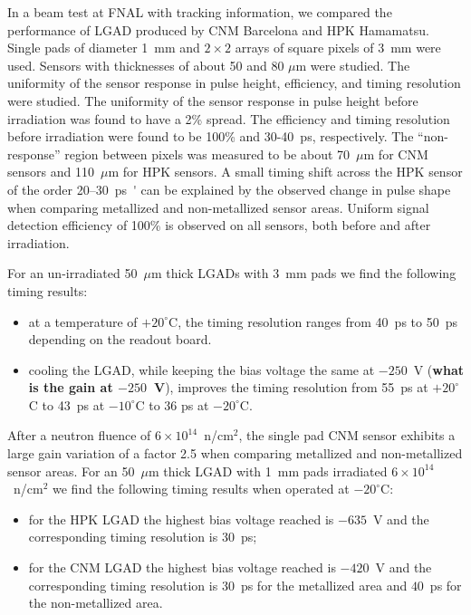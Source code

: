 \documentclass[preprint,1p]{elsarticle}
\begin{document}
In a beam test at FNAL with tracking information, we compared the performance of
LGAD produced by CNM Barcelona and HPK Hamamatsu. Single pads of diameter 1~mm
and $2\times 2$ arrays of square pixels of 3~mm were used. Sensors with
thicknesses of about 50 and 80 $\mu$m were studied. The uniformity of the
sensor response in pulse height, efficiency, and timing resolution
were studied. The uniformity of the
sensor response in pulse height before irradiation was found to have a
2\% spread. The efficiency and timing  resolution before irradiation
were found to be 100\%  and 30-40~\si{ps}, respectively. The
``non-response'' region between pixels was measured to be about 70~$\mu$m for CNM sensors and 110~$\mu$m for HPK sensors. 
A small timing shift across the HPK sensor of the order 20--30~\si{ps'} can
be explained by the observed change in pulse shape when comparing metallized and
non-metallized sensor areas. Uniform signal detection efficiency of 100\% is
observed on all sensors, both before and after irradiation. 

For an un-irradiated 50~$\mu$m thick LGADs with 3~mm pads we find the following timing results: 
\begin{itemize}
  \item at a temperature of $+20^{\circ}$C, the timing resolution ranges from
        40~ps to 50~ps depending on the readout board. %
  \item cooling the LGAD, while keeping the bias voltage the same at $-250$~V
        (\textbf {what is the gain at $-250$~V}),
        improves the timing resolution from 55~ps at $+20^{\circ}$C to 43~ps at
        $-10^{\circ}$C to 36 ps at $-20^{\circ}$C. \end{itemize}

After a neutron fluence of $6\times 10^{14}$~n/cm$^2$, the single pad CNM sensor
exhibits a large gain variation of a factor 2.5 when comparing metallized and
non-metallized sensor areas. For an 50~$\mu$m thick LGAD with 1~mm pads
irradiated $6\times 10^{14}$~n/cm$^2$ we find the following timing results when
operated at $-20^{\circ}$C: 

\begin{itemize}
  \item for the HPK LGAD the highest bias voltage reached is $-635$~V
    and the corresponding timing resolution is 30~ps; 
  \item for the CNM LGAD the highest bias voltage reached is $-420$~V
    and the corresponding
        timing resolution is 30~ps for the metallized area and $40$~ps for the
        non-metallized area.
  
\end{itemize}
\end{document}
